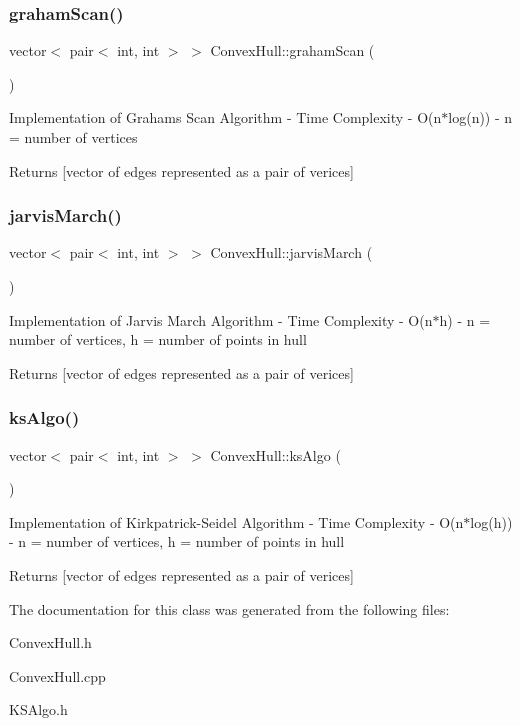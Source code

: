 \subsubsection{\texorpdfstring{graham\+Scan()}{grahamScan()}}
{\footnotesize\ttfamily vector$<$ pair$<$ int, int $>$ $>$ Convex\+Hull\+::graham\+Scan (\begin{DoxyParamCaption}{ }\end{DoxyParamCaption})}

Implementation of Graham\textquotesingle{}s Scan Algorithm -\/ Time Complexity -\/ O(n$\ast$log(n)) -\/ n = number of vertices \begin{DoxyReturn}{Returns}
\mbox{[}vector of edges represented as a pair of verices\mbox{]} 
\end{DoxyReturn}
\mbox{\label{classConvexHull_a56d248ed5b470d33f2036aae04c597b0}} 
\subsubsection{\texorpdfstring{jarvis\+March()}{jarvisMarch()}}
{\footnotesize\ttfamily vector$<$ pair$<$ int, int $>$ $>$ Convex\+Hull\+::jarvis\+March (\begin{DoxyParamCaption}{ }\end{DoxyParamCaption})}

Implementation of Jarvis March Algorithm -\/ Time Complexity -\/ O(n$\ast$h) -\/ n = number of vertices, h = number of points in hull \begin{DoxyReturn}{Returns}
\mbox{[}vector of edges represented as a pair of verices\mbox{]} 
\end{DoxyReturn}
\mbox{\label{classConvexHull_afee5633718d639bc8e94b123eea4c168}} 
\subsubsection{\texorpdfstring{ks\+Algo()}{ksAlgo()}}
{\footnotesize\ttfamily vector$<$ pair$<$ int, int $>$ $>$ Convex\+Hull\+::ks\+Algo (\begin{DoxyParamCaption}{ }\end{DoxyParamCaption})}

Implementation of Kirkpatrick-\/\+Seidel Algorithm -\/ Time Complexity -\/ O(n$\ast$log(h)) -\/ n = number of vertices, h = number of points in hull \begin{DoxyReturn}{Returns}
\mbox{[}vector of edges represented as a pair of verices\mbox{]} 
\end{DoxyReturn}


The documentation for this class was generated from the following files\+:\begin{DoxyCompactItemize}
\item 
Convex\+Hull.\+h\item 
Convex\+Hull.\+cpp\item 
K\+S\+Algo.\+h\end{DoxyCompactItemize}

